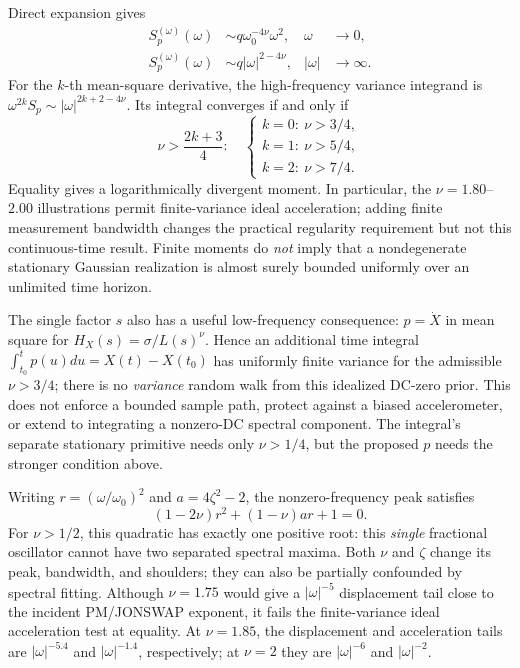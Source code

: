 Direct expansion gives
\begin{align}
S_p^{(\omega)}(\omega)&\sim
q\omega_0^{-4\nu}\omega^2,&\omega&\to0,\label{eq:frac-low}\\
S_p^{(\omega)}(\omega)&\sim
q|\omega|^{2-4\nu},&|\omega|&\to\infty.
\label{eq:frac-high}
\end{align}
For the \(k\)-th mean-square derivative, the high-frequency variance
integrand is \(\omega^{2k}S_p\sim|\omega|^{2k+2-4\nu}\).
Its integral converges if and only if
\begin{equation}
\boxed{\nu>\frac{2k+3}{4}:\quad
\begin{cases}
k=0:\ \nu>3/4,\\
k=1:\ \nu>5/4,\\
k=2:\ \nu>7/4.
\end{cases}}
\label{eq:frac-moments}
\end{equation}
Equality gives a logarithmically divergent moment. In particular,
the \(\nu=1.80\)--\(2.00\) illustrations permit finite-variance
ideal acceleration; adding finite measurement bandwidth changes the
practical regularity requirement but not this continuous-time result.
Finite moments do \emph{not} imply that a nondegenerate stationary
Gaussian realization is almost surely bounded uniformly over an
unlimited time horizon.

The single factor \(s\) also has a useful low-frequency consequence:
\(p=\dot X\) in mean square for
\(H_X(s)=\sigma/L(s)^\nu\). Hence an additional time integral
\(\int_{t_0}^t p(u)du=X(t)-X(t_0)\) has uniformly finite
variance for the admissible \(\nu>3/4\); there is no \emph{variance}
random walk from this idealized DC-zero prior. This does not enforce a
bounded sample path, protect against a biased accelerometer, or extend
to integrating a nonzero-DC spectral component. The integral's separate
stationary primitive needs only \(\nu>1/4\), but the proposed
\(p\) needs the stronger condition above.

Writing \(r=(\omega/\omega_0)^2\) and \(a=4\zeta^2-2\), the
nonzero-frequency peak satisfies
\begin{equation}
(1-2\nu)r^2+(1-\nu)ar+1=0.
\label{eq:frac-peak}
\end{equation}
For \(\nu>1/2\), this quadratic has exactly one positive root:
this \emph{single} fractional oscillator cannot have two separated
spectral maxima. Both \(\nu\) and \(\zeta\) change its peak, bandwidth,
and shoulders; they can also be partially confounded by spectral fitting.
Although \(\nu=1.75\) would give a \(|\omega|^{-5}\) displacement
tail close to the incident PM/JONSWAP exponent, it fails the
finite-variance ideal acceleration test at equality. At \(\nu=1.85\),
the displacement and acceleration tails are \(|\omega|^{-5.4}\)
and \(|\omega|^{-1.4}\), respectively; at \(\nu=2\) they are
\(|\omega|^{-6}\) and \(|\omega|^{-2}\).

